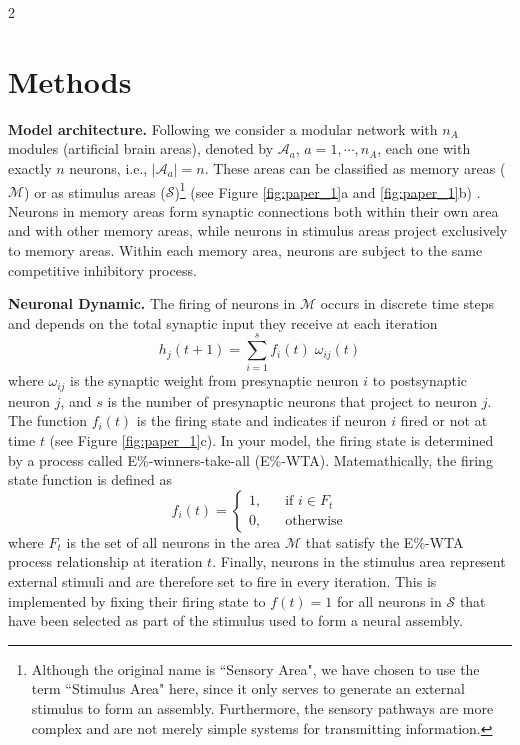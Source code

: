 \documentclass[a4paper, 10pt]{article}
\begin{document}
\begin{multicols}{2}
\section*{Methods}
\noindent
\noindent\textbf{Model architecture.} Following \cite{christos}  we consider a modular network  with $n_A$ modules (artificial brain areas), denoted by  $\mathcal{A}_a$, $a=1,\cdots, n_A$, each one with exactly $n$ neurons, i.e., $|\mathcal{A}_a| = n$.  These areas can be classified as memory areas ($\mathcal{M}$) or as stimulus areas ($\mathcal{S}$)\footnote{Although the original name is ``Sensory Area", we have chosen to use the term ``Stimulus Area" here, since it only serves to generate an external stimulus to form an assembly. Furthermore, the sensory pathways are more complex and are not merely simple systems for transmitting information.} (see Figure \ref{fig:paper_1}a and \ref{fig:paper_1}b)  \cite{lengstein}. Neurons in memory areas form synaptic connections both within their own area and with other memory areas, while neurons in stimulus areas project exclusively to memory areas. Within each memory area, neurons are subject to the same competitive inhibitory process. \newline 


\noindent\textbf{Neuronal Dynamic.} The firing of neurons in 
$\mathcal{M}$ occurs in discrete time steps and depends on the total synaptic input they receive at each iteration
\begin{equation}\label{eq:inp}
     h_j(t+1) = \sum\limits_{i=1}^{s} f_i(t) \;\omega_{ij}(t) 
\end{equation}
where  $\omega_{ij}$ is the synaptic 
weight from presynaptic neuron $i$
 to postsynaptic neuron $j$, and $s$ is the number of presynaptic neurons that project to neuron $j$. The function $f_i(t)$ is the firing state \cite{daniel} and indicates if neuron $i$ fired or not at time $t$ (see Figure \ref{fig:paper_1}c). In your model, the firing state is determined by a process called E\%-winners-take-all (E\%-WTA). Matemathically, the firing state function is defined as
\begin{equation}
        f_i(t)=
        \begin{cases}
            1\text{,} &\quad\text{if $i \in F_{t}$ }\\
            0\text{,} &\quad\text{otherwise}
        \end{cases}
        \label{eq2}
    \end{equation}
where $F_{t}$ is the set of all neurons in the area $\mathcal{M}$ that satisfy the E\%-WTA process relationship at iteration $t$. Finally, neurons in the stimulus area represent external stimuli and are therefore set to fire in every iteration. This is implemented by fixing their firing state to 
$f(t)=1$ for all neurons in 
$\mathcal{S}$ that have been selected as part of the stimulus used to form a neural assembly.


\end{multicols}
\end{document}
